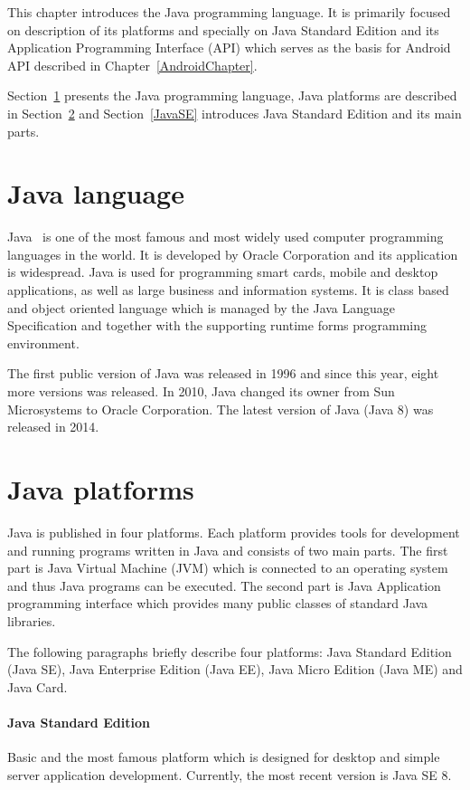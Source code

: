 This chapter introduces the Java programming language. It is primarily focused on description of its platforms and
specially on Java Standard Edition and its Application Programming Interface (API) which serves as the basis for Android
API described in Chapter~\ref{AndroidChapter}.

Section~\ref{JavaLang} presents the Java programming language, Java platforms are described in
Section~\ref{JavaPlatforms} and Section~\ref{JavaSE} introduces Java Standard Edition and its main parts.

\section{Java language}\label{JavaLang}
Java~\cite{JavaBook, Java6Doc} is one of the most famous and most widely used computer programming languages in the
world. It is developed by Oracle Corporation and its application is widespread. Java is used for programming smart
cards, mobile and desktop applications, as well as large business and information systems. It is class based and object
oriented language which is managed by the Java Language Specification and together with the supporting runtime forms
programming environment.

The first public version of Java was released in 1996 and since this year, eight more versions was released. In 2010,
Java changed its owner from Sun Microsystems to Oracle Corporation. The latest version of Java (Java 8) was released in
2014.

\section{Java platforms}\label{JavaPlatforms}
Java is published in four platforms. Each platform provides tools for development and running programs written in Java
and consists of two main parts. The first part is Java Virtual Machine (JVM) which is connected to an operating system
and thus Java programs can be executed. The second part is Java Application programming interface which provides many
public classes of standard Java libraries.

The following paragraphs briefly describe four platforms: Java Standard Edition (Java SE), Java Enterprise Edition
(Java EE), Java Micro Edition (Java ME) and Java Card.

\paragraph{Java Standard Edition}
Basic and the most famous platform which is designed for desktop and simple server application development. Currently,
the most recent version is Java SE 8.

